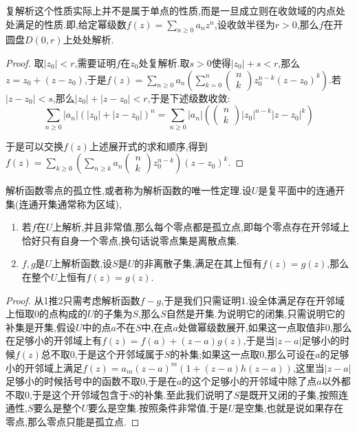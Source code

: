 复解析这个性质实际上并不是属于单点的性质,而是一旦成立则在收敛域的内点处处满足的性质.即,给定幂级数$f(z)=\sum_{n\ge0}a_nz^n$,设收敛半径为$r>0$,那么$f$在开圆盘$D(0,r)$上处处解析.
\begin{proof}
	
	取$|z_0|<r$,需要证明$f$在$z_0$处复解析.取$s>0$使得$|z_0|+s<r$,那么$z=z_0+(z-z_0)$,于是$f(z)=\sum_{n\ge0}a_n\left(\sum_{k=0}^n\left(\begin{array}{c} n\\ k\end{array}\right)z_0^{n-k}(z-z_0)^k\right)$.若$|z-z_0|<s$,那么$|z_0|+|z-z_0|<r$,于是下述级数收敛:
	$$\sum_{n\ge0}|a_n|(|z_0|+|z-z_0|)^n=\sum_{n\ge0}|a_n|\left(\left(\begin{array}{c} n\\ k\end{array}\right)|z_0|^{n-k}|z-z_0|^k\right)$$
	
	于是可以交换$f(z)$上述展开式的求和顺序,得到$f(z)=\sum_{k\ge0}\left(\sum_{n\ge k}a_n\left(\begin{array}{c} n\\ k\end{array}\right)z_0^{n-k}\right)(z-z_0)^k$.
\end{proof}

解析函数零点的孤立性,或者称为解析函数的唯一性定理.设$U$是复平面中的连通开集(连通开集通常称为区域),
\begin{enumerate}
	\item 若$f$在$U$上解析,并且非常值,那么每个零点都是孤立点,即每个零点存在开邻域上恰好只有自身一个零点,换句话说零点集是离散点集.
	\item $f,g$是$U$上解析函数,设$S$是$U$的非离散子集,满足在其上恒有$f(z)=g(z)$,那么在整个$U$上恒有$f(z)=g(z)$.
\end{enumerate}
\begin{proof}
	
	从1推2只需考虑解析函数$f-g$,于是我们只需证明1.设全体满足存在开邻域上恒取0的点构成的$U$的子集为$S$,那么$S$自然是开集.为说明它的闭集,只需说明它的补集是开集,假设$U$中的点$a$不在$S$中,在点$a$处做幂级数展开,如果这一点取值非0,那么在足够小的开邻域上有$f(z)=f(a)+(z-a)g(z)$,于是当$|z-a|$足够小的时候$f(z)$总不取0,于是这个开邻域属于$S$的补集;如果这一点取0,那么可设在$a$的足够小的开邻域上满足$f(z)=a_m(z-a)^m(1+(z-a)h(z-a))$,这里当$|z-a|$足够小的时候括号中的函数不取0,于是在$a$的这个足够小的开邻域中除了点$a$以外都不取0,于是这个开邻域包含于$S$的补集.至此我们说明了$S$是既开又闭的子集,按照连通性,$S$要么是整个$U$要么是空集.按照条件非常值,于是$U$是空集,也就是说如果存在零点,那么零点只能是孤立点.
\end{proof}

